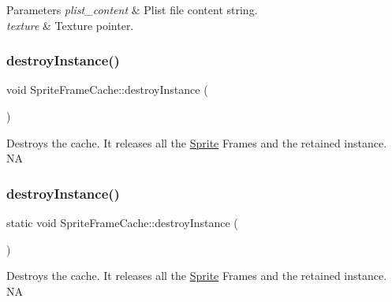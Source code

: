 \begin{DoxyParams}{Parameters}
{\em plist\+\_\+content} & Plist file content string. \\
\hline
{\em texture} & Texture pointer. \\
\hline
\end{DoxyParams}
\mbox{\label{classSpriteFrameCache_af23cb4be28289ff0cf3d5e88afe56046}} 
\subsubsection{\texorpdfstring{destroy\+Instance()}{destroyInstance()}\hspace{0.1cm}{\footnotesize\ttfamily [1/2]}}
{\footnotesize\ttfamily void Sprite\+Frame\+Cache\+::destroy\+Instance (\begin{DoxyParamCaption}{ }\end{DoxyParamCaption})\hspace{0.3cm}{\ttfamily [static]}}

Destroys the cache. It releases all the \hyperlink{classSprite}{Sprite} Frames and the retained instance.  NA \mbox{\label{classSpriteFrameCache_a6086d8302dc1f9537fdf85d59d35ff9a}} 
\subsubsection{\texorpdfstring{destroy\+Instance()}{destroyInstance()}\hspace{0.1cm}{\footnotesize\ttfamily [2/2]}}
{\footnotesize\ttfamily static void Sprite\+Frame\+Cache\+::destroy\+Instance (\begin{DoxyParamCaption}{ }\end{DoxyParamCaption})\hspace{0.3cm}{\ttfamily [static]}}

Destroys the cache. It releases all the \hyperlink{classSprite}{Sprite} Frames and the retained instance.  NA \mbox{\label{classSpriteFrameCache_afc6f3a882c36cfd48e4b450a6fcbf535}} 
